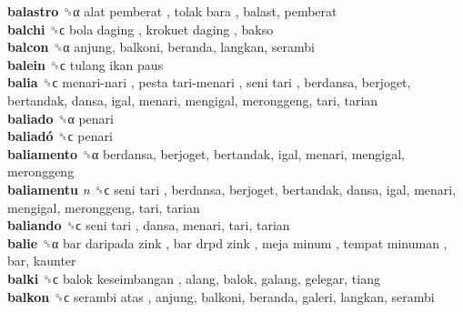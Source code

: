 \textbf{balastro} ␝α   alat pemberat ,  tolak bara , balast, pemberat  \\
\textbf{balchi} ␝ϲ   bola daging ,  krokuet daging , bakso  \\
\textbf{balcon} ␝α  anjung, balkoni, beranda, langkan, serambi  \\
\textbf{balein} ␝ϲ   tulang ikan paus   \\
\textbf{balia} ␝ϲ   menari-nari ,  pesta tari-menari ,  seni tari , berdansa, berjoget, bertandak, dansa, igal, menari, mengigal, meronggeng, tari, tarian  \\
\textbf{baliado} ␝α  penari  \\
\textbf{baliadó} ␝ϲ  penari  \\
\textbf{baliamento} ␝α  berdansa, berjoget, bertandak, igal, menari, mengigal, meronggeng  \\
\textbf{baliamentu} \emph{n}  ␝ϲ   seni tari , berdansa, berjoget, bertandak, dansa, igal, menari, mengigal, meronggeng, tari, tarian  \\
\textbf{baliando} ␝ϲ   seni tari , dansa, menari, tari, tarian  \\
\textbf{balie} ␝α   bar daripada zink ,  bar drpd zink ,  meja minum ,  tempat minuman , bar, kaunter  \\
\textbf{balki} ␝ϲ   balok keseimbangan , alang, balok, galang, gelegar, tiang  \\
\textbf{balkon} ␝ϲ   serambi atas , anjung, balkoni, beranda, galeri, langkan, serambi  \\
